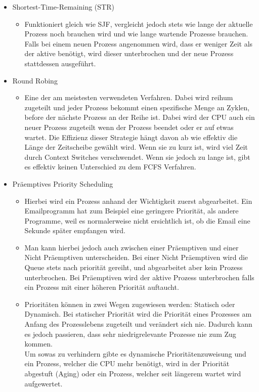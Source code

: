 \documentclass{article}
\begin{document}
	\begin{itemize}
		\item{Shortest-Time-Remaining (STR)}
		\begin{itemize}
			\item{Funktioniert gleich wie SJF, vergleicht jedoch stets wie lange der aktuelle Prozess noch brauchen wird und wie lange wartende Prozesse brauchen. Falls bei einem neuen Prozess angenommen wird, dass er weniger Zeit als der aktive benötigt, wird dieser unterbrochen und der neue Prozess stattdessen ausgeführt.}
		\end{itemize}
		\item{Round Robing}
		\begin{itemize}
			\item{Eine der am meistesten verwendeten Verfahren. Dabei wird reihum zugeteilt und jeder Prozess bekommt einen spezifische Menge an Zyklen, before der nächste Prozess an der Reihe ist. Dabei wird der CPU auch ein neuer Prozess zugeteilt wenn der Prozess beendet oder er auf etwas wartet. Die Effizienz dieser Strategie hängt davon ab wie effektiv die Länge der Zeitscheibe gewählt wird. Wenn sie zu kurz ist, wird viel Zeit durch Context Switches verschwendet. Wenn sie jedoch zu lange ist, gibt es effektiv keinen Unterschied zu dem FCFS Verfahren.}
		\end{itemize}
		\item{Präemptives Priority Scheduling}
		\begin{itemize}
			\item{Hierbei wird ein Prozess anhand der Wichtigkeit zuerst abgearbeitet. Ein Emailprogramm hat zum Beispiel eine geringere Priorität, als andere Programme, weil es normalerweise nicht ersichtlich ist, ob die Email eine Sekunde später empfangen wird.}
			\item{Man kann hierbei jedoch auch zwischen einer Präemptiven und einer Nicht Präemptiven unterscheiden. Bei einer Nicht Präemptiven wird die Queue stets nach priorität gereiht, und abgearbeitet aber kein Prozess unterbrochen. Bei Präemptiven wird der aktive Prozess unterbrochen falls ein Prozess mit einer höheren Priorität auftaucht.}
			\item{Prioritäten können in zwei Wegen zugewiesen werden: Statisch oder Dynamisch. Bei statischer Priorität wird die Priorität eines Prozesses am Anfang des Prozesslebens zugeteilt und verändert sich nie. Dadurch kann es jedoch passieren, dass sehr niedrigrelevante Prozesse nie zum Zug kommen. \\
			Um sowas zu verhindern gibte es dynamische Prioritätenzuweisung und ein Prozess, welcher die CPU mehr benötigt, wird in der Priorität abgestuft (Aging) oder ein Prozess, welcher seit längerem wartet wird aufgewertet.}

\end{itemize}
\end{itemize}
\end{document}

